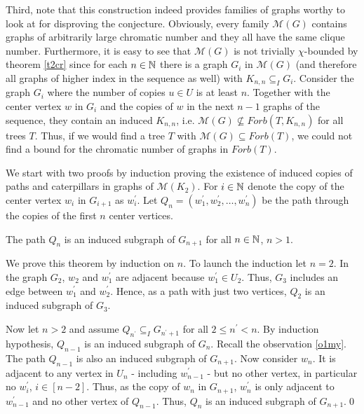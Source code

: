 Third, note that this construction indeed provides families of graphs worthy to look at for disproving the conjecture. Obviously, every family $\mathcal{M}(G)$ contains graphs of arbitrarily large chromatic number and they all have the same clique number. Furthermore, it is easy to see that $\mathcal{M}(G)$ is not trivially $\chi$-bounded by theorem \ref{t2cr} since for each $n\in\mathbb{N}$ there is a graph $G_i$ in $\mathcal{M}(G)$ (and therefore all graphs of higher index in the sequence as well) with $K_{n,n}\subseteq_I G_i$. Consider the graph $G_i$ where the number of copies $u\in U$ is at least $n$. Together with the center vertex $w$ in $G_i$ and the copies of $w$ in the next $n-1$ graphs of the sequence, they contain an induced $K_{n,n}$, i.e. $\mathcal{M}(G)\nsubseteq\textit{Forb}(T,K_{n,n})$ for all trees $T$. Thus, if we would find a tree $T$ with $\mathcal{M}(G)\subseteq \textit{Forb}(T)$, we could not find a bound for the chromatic number of graphs in $\textit{Forb}(T)$.

We start with two proofs by induction proving the existence of induced copies of paths and caterpillars in graphs of $\mathcal{M}(K_2)$. For $i\in\mathbb{N}$ denote the copy of the center vertex $w_i$ in $G_{i+1}$ as $w_i^\prime$. Let $Q_n =(w_1^\prime ,w_2^\prime ,\dots ,w_n^\prime)$ be the path through the copies of the first $n$ center vertices. 
\begin{thm}\label{t1my}
The path $Q_n$ is an induced subgraph of $G_{n+1}$ for all $n\in\mathbb{N}$, $n>1$.
\end{thm}
\begin{prf}
We prove this theorem by induction on $n$. To launch the induction let $n=2$. In the graph $G_2$, $w_2$ and $w^\prime_1$ are adjacent because $w^\prime_1\in U_2$. Thus, $G_3$ includes an edge between $w^\prime_1$ and $w^\prime_2$. Hence, as a path with just two vertices, $Q_2$ is an induced subgraph of $G_3$.

Now let $n>2$ and assume $Q_{n^\prime}\subseteq_I G_{n^\prime +1}$ for all $2\leq n^\prime <n$. By induction hypothesis, $Q_{n-1}$ is an induced subgraph of $G_n$. Recall the observation \ref{o1my}. The path $Q_{n-1}$ is also an induced subgraph of $G_{n+1}$. 
Now consider $w_n$. It is adjacent to any vertex in $U_n$ - including $w^\prime_{n-1}$ - but no other vertex, in particular no $w^\prime_i$, $i\in [n-2]$. Thus, as the copy of $w_n$ in $G_{n+1}$, $w^\prime_n$ is only adjacent to $w^\prime_{n-1}$ and no other vertex of $Q_{n-1}$. Thus, $Q_n$ is an induced subgraph of $G_{n+1}$.\qed
\end{prf}

